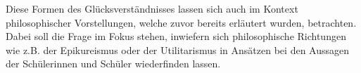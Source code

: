 Diese Formen des Glücksverständnisses lassen sich auch im Kontext philosophischer Vorstellungen, welche zuvor bereits erläutert wurden, betrachten. 
Dabei soll die Frage im Fokus stehen, inwiefern sich philosophische Richtungen wie z.B. der Epikureismus oder der Utilitarismus in Ansätzen bei den Aussagen der Schülerinnen und Schüler wiederfinden lassen. 